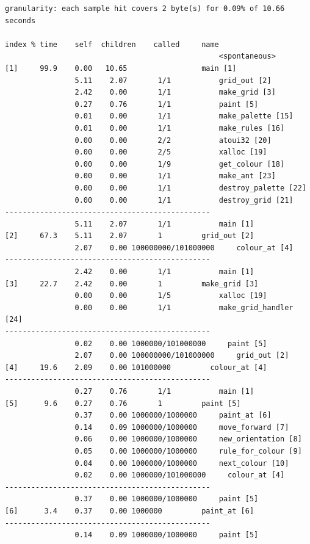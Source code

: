\documentclass[a4paper, 10pt, twoside, notitlepage]{article}
\begin{document}
\scriptsize
\begin{verbatim}
granularity: each sample hit covers 2 byte(s) for 0.09% of 10.66 seconds

index % time    self  children    called     name
                                                 <spontaneous>
[1]     99.9    0.00   10.65                 main [1]
                5.11    2.07       1/1           grid_out [2]
                2.42    0.00       1/1           make_grid [3]
                0.27    0.76       1/1           paint [5]
                0.01    0.00       1/1           make_palette [15]
                0.01    0.00       1/1           make_rules [16]
                0.00    0.00       2/2           atoui32 [20]
                0.00    0.00       2/5           xalloc [19]
                0.00    0.00       1/9           get_colour [18]
                0.00    0.00       1/1           make_ant [23]
                0.00    0.00       1/1           destroy_palette [22]
                0.00    0.00       1/1           destroy_grid [21]
-----------------------------------------------
                5.11    2.07       1/1           main [1]
[2]     67.3    5.11    2.07       1         grid_out [2]
                2.07    0.00 100000000/101000000     colour_at [4]
-----------------------------------------------
                2.42    0.00       1/1           main [1]
[3]     22.7    2.42    0.00       1         make_grid [3]
                0.00    0.00       1/5           xalloc [19]
                0.00    0.00       1/1           make_grid_handler [24]
-----------------------------------------------
                0.02    0.00 1000000/101000000     paint [5]
                2.07    0.00 100000000/101000000     grid_out [2]
[4]     19.6    2.09    0.00 101000000         colour_at [4]
-----------------------------------------------
                0.27    0.76       1/1           main [1]
[5]      9.6    0.27    0.76       1         paint [5]
                0.37    0.00 1000000/1000000     paint_at [6]
                0.14    0.09 1000000/1000000     move_forward [7]
                0.06    0.00 1000000/1000000     new_orientation [8]
                0.05    0.00 1000000/1000000     rule_for_colour [9]
                0.04    0.00 1000000/1000000     next_colour [10]
                0.02    0.00 1000000/101000000     colour_at [4]
-----------------------------------------------
                0.37    0.00 1000000/1000000     paint [5]
[6]      3.4    0.37    0.00 1000000         paint_at [6]
-----------------------------------------------
                0.14    0.09 1000000/1000000     paint [5]

\end{verbatim}
\end{document}
